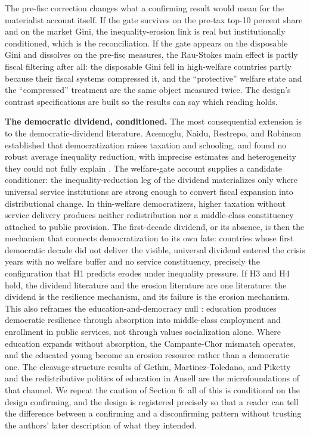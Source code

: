 The pre-fisc correction changes what a confirming result would mean for the materialist account itself. If the gate survives on the pre-tax top-10 percent share and on the market Gini, the inequality-erosion link is real but institutionally conditioned, which is the reconciliation. If the gate appears on the disposable Gini and dissolves on the pre-fisc measures, the Rau-Stokes main effect is partly fiscal filtering after all: the disposable Gini fell in high-welfare countries partly because their fiscal systems compressed it, and the ``protective'' welfare state and the ``compressed'' treatment are the same object measured twice. The design's contrast specifications are built so the results can say which reading holds.

\textbf{The democratic dividend, conditioned.} The most consequential extension is to the democratic-dividend literature. Acemoglu, Naidu, Restrepo, and Robinson established that democratization raises taxation and schooling, and found no robust average inequality reduction, with imprecise estimates and heterogeneity they could not fully explain \citep{AcemogluNaidu2015}. The welfare-gate account supplies a candidate conditioner: the inequality-reduction leg of the dividend materializes only where universal service institutions are strong enough to convert fiscal expansion into distributional change. In thin-welfare democratizers, higher taxation without service delivery produces neither redistribution nor a middle-class constituency attached to public provision. The first-decade dividend, or its absence, is then the mechanism that connects democratization to its own fate: countries whose first democratic decade did not deliver the visible, universal dividend entered the crisis years with no welfare buffer and no service constituency, precisely the configuration that H1 predicts erodes under inequality pressure. If H3 and H4 hold, the dividend literature and the erosion literature are one literature: the dividend is the resilience mechanism, and its failure is the erosion mechanism. This also reframes the education-and-democracy null \citep{AcemogluJohnson2005}: education produces democratic resilience through absorption into middle-class employment and enrollment in public services, not through values socialization alone. Where education expands without absorption, the Campante-Chor mismatch \citep{CampanteChor2012} operates, and the educated young become an erosion resource rather than a democratic one. The cleavage-structure results of Gethin, Martinez-Toledano, and Piketty \citep{Gethin2022} and the redistributive politics of education in Ansell \citep{Ansell2010} are the microfoundations of that channel. We repeat the caution of Section 6: all of this is conditional on the design confirming, and the design is registered precisely so that a reader can tell the difference between a confirming and a disconfirming pattern without trusting the authors' later description of what they intended.

